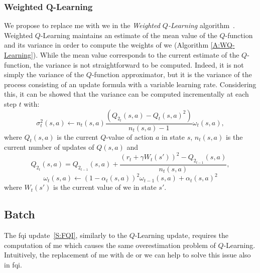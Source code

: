 \subsubsection{Weighted Q-Learning}
We propose to replace \gls{me} with \gls{we} in the \textit{Weighted $Q$-Learning} algorithm~\cite{deramo2016estimating}. Weighted $Q$-Learning maintains an estimate of the mean value of the $Q$-function and its variance in order to compute the weights of \gls{we} (Algorithm \ref{A:WQ-Learning}).
While the mean value corresponds to the current estimate of the $Q$-function, the variance is not straightforward to be computed. Indeed, it is not simply the variance of the $Q$-function approximator, but it is the variance of the process consisting of an update formula with a variable learning rate. Considering this, it can be showed that the variance can be computed incrementally at each step $t$ with:
$$\sigma^2_t(s,a) \leftarrow n_t(s,a) \dfrac{(Q_{2_t}(s,a) - Q_t(s,a)^2)}{n_t(s,a) - 1} \omega_t(s,a),$$
where $Q_t(s,a)$ is the current $Q$-value of action $a$ in state $s$, $n_t(s,a)$ is the current number of updates of $Q(s,a)$ and
$$Q_{2_t}(s,a) = Q_{2_{t-1}}(s,a) + \dfrac{(r_t + \gamma W_t(s'))^2 - Q_{2_{t-1}}(s,a)}{n_t(s,a)},$$
$$\omega_t(s,a) \leftarrow (1 - \alpha_t(s,a))^2 \omega_{t-1}(s,a) + \alpha_t(s,a)^2$$
where $W_t(s')$ is the current value of \gls{we} in state $s'$.

\subsection{Batch}
The \gls{fqi} update~\ref{S:FQI}, similarly to the $Q$-Learning update, requires the computation of \gls{me} which causes the same overestimation problem of $Q$-Learning. Intuitively, the replacement of \gls{me} with \gls{de} or \gls{we} can help to solve this issue also in \gls{fqi}.

